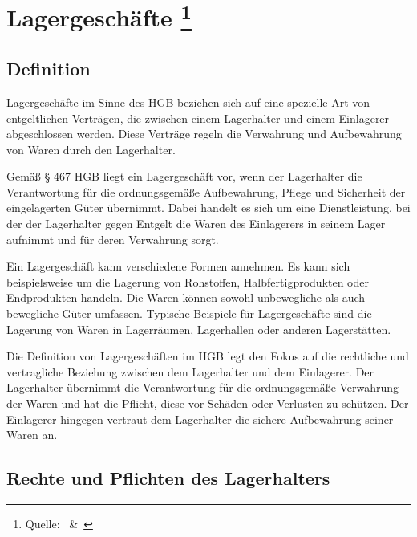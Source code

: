 

\chapter[Lagergeschäfte]{Lagergeschäfte \footnote{Quelle:~\cite{Handelsrecht} \&~\cite{lagergeschaeft}}}

\section{Definition}
Lagergeschäfte im Sinne des HGB beziehen sich auf eine spezielle Art von entgeltlichen Verträgen, die zwischen einem Lagerhalter und einem Einlagerer abgeschlossen werden. Diese Verträge regeln die Verwahrung und Aufbewahrung von Waren durch den Lagerhalter.

Gemäß § 467 HGB liegt ein Lagergeschäft vor, wenn der Lagerhalter die Verantwortung für die ordnungsgemäße Aufbewahrung, Pflege und Sicherheit der eingelagerten Güter übernimmt. Dabei handelt es sich um eine Dienstleistung, bei der der Lagerhalter gegen Entgelt die Waren des Einlagerers in seinem Lager aufnimmt und für deren Verwahrung sorgt.

Ein Lagergeschäft kann verschiedene Formen annehmen. Es kann sich beispielsweise um die Lagerung von Rohstoffen, Halbfertigprodukten oder Endprodukten handeln. Die Waren können sowohl unbewegliche als auch bewegliche Güter umfassen. Typische Beispiele für Lagergeschäfte sind die Lagerung von Waren in Lagerräumen, Lagerhallen oder anderen Lagerstätten.

Die Definition von Lagergeschäften im HGB legt den Fokus auf die rechtliche und vertragliche Beziehung zwischen dem Lagerhalter und dem Einlagerer. Der Lagerhalter übernimmt die Verantwortung für die ordnungsgemäße Verwahrung der Waren und hat die Pflicht, diese vor Schäden oder Verlusten zu schützen. Der Einlagerer hingegen vertraut dem Lagerhalter die sichere Aufbewahrung seiner Waren an.
\section{Rechte und Pflichten des Lagerhalters}

